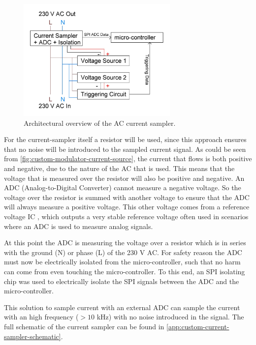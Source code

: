 \begin{figure}[h]
	\centering
	\includegraphics[angle=0,width=0.7\textwidth,keepaspectratio]{chapters/hardware-chapters/AC/ac-current-sampler/ac-current-sampler-architectural.JPG}
	\caption{Architectural overview of the AC current sampler.}
	\label{fig:ac-current-sampler-architectural}
\end{figure}


For the current-sampler itself a resistor will be used, since this approach ensures that no noise will be introduced to the sampled current signal.
As could be seen from \autoref{fig:custom-modulator-current-source}, the current that flows is both positive and negative, due to the nature of the AC that is used.
This means that the voltage that is measured over the resistor will also be positive and negative.
An ADC (Analog-to-Digital Converter) cannot measure a negative voltage.
So the voltage over the resistor is summed with another voltage to ensure that the ADC will always measure a positive voltage.
This other voltage comes from a reference voltage IC \cite{lm336z-ref-voltage-datasheet}, which outputs a very stable reference voltage often used in scenarios where an ADC is used to measure analog signals.

At this point the ADC is measuring the voltage over a resistor which is in series with the ground (N) or phase (L) of the 230 V AC.
For safety reason the ADC must now be electrically isolated from the micro-controller, such that no harm can come from even touching the micro-controller.
To this end, an SPI isolating chip was used \cite{iso7241m-spi-isolator-datasheet} to electrically isolate the SPI signals between the ADC and the micro-controller.




This solution to sample current with an external ADC can sample the current with an high frequency ($> 10$ kHz) with no noise introduced in the signal.
The full schematic of the current sampler can be found in \autoref{app:custom-current-sampler-schematic}.



